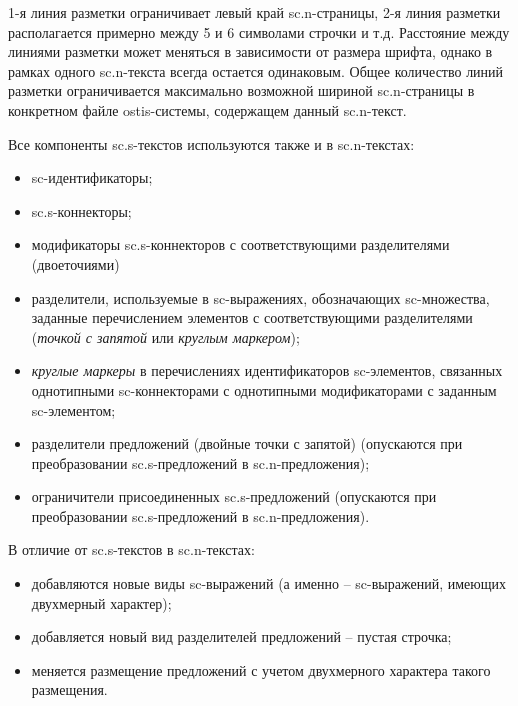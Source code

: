 \begin{SCn}
\end{SCn}
1-я линия разметки ограничивает левый край sc.n-страницы, 2-я линия разметки располагается примерно между 5 и 6 символами строчки и т.д. Расстояние между линиями разметки может меняться в зависимости от размера шрифта, однако в рамках одного sc.n-текста всегда остается одинаковым. Общее количество линий разметки ограничивается максимально возможной шириной sc.n-страницы в конкретном файле ostis-системы, содержащем данный sc.n-текст.

\begin{SCn}
\begin{scnhaselementset}
\end{scnhaselementset}
\end{SCn}


Все компоненты sc.s-текстов используются также и в sc.n-текстах:
\begin{itemize}
	\item sc-идентификаторы;
	\item sc.s-коннекторы;
	\item модификаторы sc.s-коннекторов с соответствующими разделителями (двоеточиями)
	\item разделители, используемые в sc-выражениях, обозначающих sc-множества, заданные перечислением элементов с соответствующими разделителями (\textit{точкой с запятой} или \textit{круглым маркером});
	\item \textit{круглые маркеры} в перечислениях идентификаторов \mbox{sc-элементов}, связанных однотипными sc-коннекторами с однотипными модификаторами с заданным sc-элементом;
	\item разделители предложений (двойные точки с запятой) (опускаются при преобразовании \mbox{sc.s-предложений} в \mbox{sc.n-предложения});
	\item ограничители присоединенных sc.s-предложений (опускаются при преобразовании sc.s-предложений в sc.n-предложения).
\end{itemize}

В отличие от sc.s-текстов в sc.n-текстах:
\begin{itemize}
	\item добавляются новые виды sc-выражений (а именно -- sc-выражений, имеющих двухмерный характер);
	\item добавляется новый вид разделителей предложений -- пустая строчка;
	\item меняется размещение предложений с учетом двухмерного характера такого размещения.
\end{itemize}

